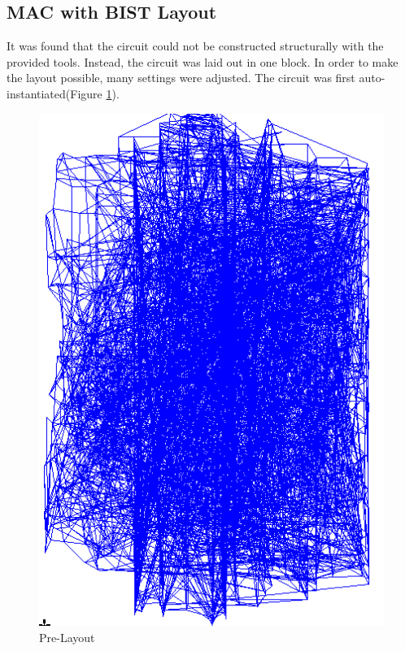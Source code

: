 \documentclass[11pt]{article}
\begin{document}
		
	\subsection{MAC with BIST Layout}
	
		It was found that the circuit could not be constructed structurally with the provided tools. Instead, the circuit was laid out in one block. In order to make the layout possible, many settings were adjusted. The circuit was first auto-instantiated(Figure \ref{fig:Pre-Layout}). 
	
		\begin{figure}[H] 
			\centering 
			\includegraphics[width=\textwidth,height=\dimexpr\textheight-4\baselineskip-\abovecaptionskip-\belowcaptionskip\relax,keepaspectratio]{"Pictures/Pre-Layout"}
			\caption{Pre-Layout} 
			\label{fig:Pre-Layout} 
		\end{figure}
	
\end{document}

